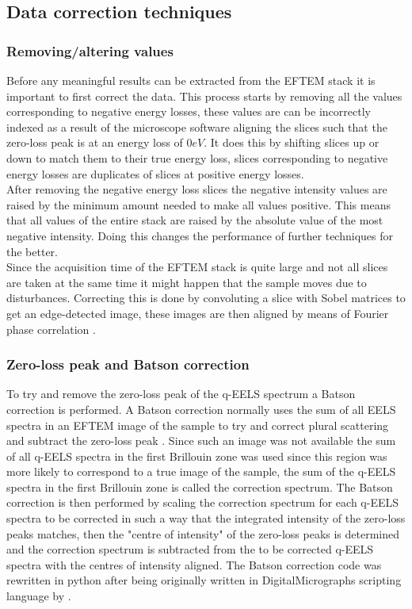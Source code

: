 \subsection{Data correction techniques}
\subsubsection{Removing/altering values}
Before any meaningful results can be extracted from the EFTEM stack it is important to first correct the data.
This process starts by removing all the values corresponding to negative energy losses, these values are can be incorrectly indexed as a result of the microscope software aligning the slices such that the zero-loss peak is at an energy loss of $0eV$.
It does this by shifting slices up or down to match them to their true energy loss, slices corresponding to negative energy losses are duplicates of slices at positive energy losses.\\
After removing the negative energy loss slices the negative intensity values are raised by the minimum amount needed to make all values positive.
This means that all values of the entire stack are raised by the absolute value of the most negative intensity. Doing this changes the performance of further techniques for the better.\\
Since the acquisition time of the EFTEM stack is quite large and not all slices are taken at the same time it might happen that the sample moves due to disturbances. Correcting this is done by convoluting a slice with Sobel matrices to get an edge-detected image, these images are then aligned by means of Fourier phase correlation \cite{Sjodahl:93}.

\subsubsection{Zero-loss peak and Batson correction}
\label{sec:batsen}
To try and remove the zero-loss peak of the q-EELS spectrum a Batson correction is performed. A Batson correction normally uses the sum of all EELS spectra in an EFTEM image of the sample to try and correct plural scattering and subtract the zero-loss peak \cite{PhysRevB.27.5224}. Since such an image was not available the sum of all q-EELS spectra in the first Brillouin zone was used since this region was more likely to correspond to a true image of the sample, the sum of the q-EELS spectra in the first Brillouin zone is called the correction spectrum.
The Batson correction is then performed by scaling the correction spectrum for each q-EELS spectra to be corrected in such a way that the integrated intensity of the zero-loss peaks matches, then the "centre of intensity" of the zero-loss peaks is determined and the correction spectrum is subtracted from the to be corrected q-EELS spectra with the centres of intensity aligned.
The Batson correction code was rewritten in python after being originally written in DigitalMicrographs scripting language by \cite{Politano2017}.


